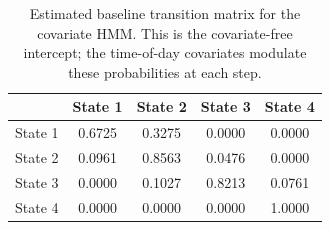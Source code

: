 \begin{table}[ht]
\centering
\begin{tabular}{lcccc}
\hline
 & State 1 & State 2 & State 3 & State 4 \\
\hline
State 1 & 0.6725 & 0.3275 & 0.0000 & 0.0000 \\
State 2 & 0.0961 & 0.8563 & 0.0476 & 0.0000 \\
State 3 & 0.0000 & 0.1027 & 0.8213 & 0.0761 \\
State 4 & 0.0000 & 0.0000 & 0.0000 & 1.0000 \\
\hline
\end{tabular}
\caption{Estimated baseline transition matrix for the covariate HMM. This is the covariate-free intercept; the time-of-day covariates modulate these probabilities at each step.}
\label{tab:covariate_hmm_transition}
\end{table}
